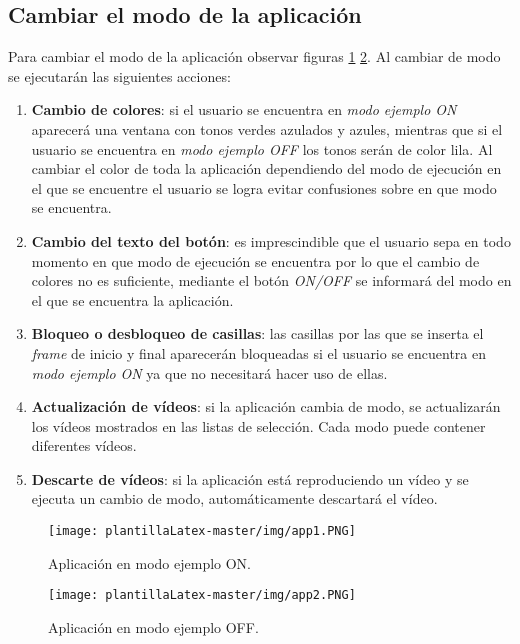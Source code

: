 \subsection{Cambiar el modo de la aplicación}
Para cambiar el modo de la aplicación observar figuras \ref{fig:app1} \ref{fig:app2}. Al cambiar de modo se ejecutarán las siguientes acciones:
\begin{enumerate}
    \item \textbf{Cambio de colores}: si el usuario se encuentra en \textit{modo ejemplo ON} aparecerá una ventana con tonos verdes azulados y azules, mientras que si el usuario se encuentra en \textit{modo ejemplo OFF} los tonos serán de color lila. Al cambiar el color de toda la aplicación dependiendo del modo de ejecución en el que se encuentre el usuario se logra evitar confusiones sobre en que modo se encuentra. 
    \item \textbf{Cambio del texto del botón}: es imprescindible que el usuario sepa en todo momento en que modo de ejecución se encuentra por lo que el cambio de colores no es suficiente, mediante el botón \textit{ON/OFF} se informará del modo en el que se encuentra la aplicación. 
    \item \textbf{Bloqueo o desbloqueo de casillas}: las casillas por las que se inserta el \textit{frame} de inicio y final aparecerán bloqueadas si el usuario se encuentra en \textit{modo ejemplo ON} ya que no necesitará hacer uso de ellas.
    \item \textbf{Actualización de vídeos}: si la aplicación cambia de modo, se actualizarán los vídeos mostrados en las listas de selección. Cada modo puede contener diferentes vídeos.
    \item \textbf{Descarte de vídeos}: si la aplicación está reproduciendo un vídeo y se ejecuta un cambio de modo, automáticamente descartará el vídeo.
\end{enumerate}

\begin{figure}[H]
    \centering
    \texttt{[image: plantillaLatex-master/img/app1.PNG]}
    \caption{Aplicación en modo ejemplo ON.}
    \label{fig:app1}
\end{figure}

\begin{figure}[H]
    \centering
    \texttt{[image: plantillaLatex-master/img/app2.PNG]}
    \caption{Aplicación en modo ejemplo OFF.}
    \label{fig:app2}
\end{figure}

